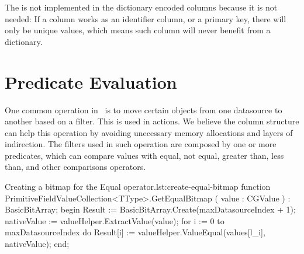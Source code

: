 The  is not implemented in the dictionary encoded columns because it is not needed: If a column works as an identifier column, or a primary key, there will only be unique values, which means such column will never benefit from a dictionary.

\section{Predicate Evaluation}
\label{sec:Predicate Evaluation}
One common operation in \gap~is to move certain objects from one datasource to another based on a filter. This is used in actions. We believe the column structure can help this operation by avoiding unecessary memory allocations and layers of indirection. The filters used in such operation are composed by one or more predicates, which can compare values with equal, not equal, greater than, less than, and other comparisons operators. 


\begin{delphicode}{Creating a bitmap for the Equal operator.}{lst:create-equal-bitmap}
function PrimitiveFieldValueCollection<TType>.GetEqualBitmap
( value : CGValue )
: BasicBitArray;
begin
  Result := BasicBitArray.Create(maxDatasourceIndex + 1);
  nativeValue := valueHelper.ExtractValue(value);
  for i := 0 to maxDatasourceIndex do
    Result[i] := valueHelper.ValueEqual(values[l_i], nativeValue);
end;
\end{delphicode}

